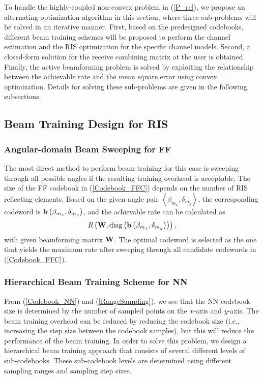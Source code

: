\documentclass[lettersize, journal]{IEEEtran}
\begin{document}
To handle the highly-coupled non-convex problem in (\ref{P_re}), we propose an alternating optimization algorithm in this section, where three sub-problems will be solved in an iterative manner.
First, based on the predesigned codebooks, different beam training schemes will be proposed to perform the channel estimation and the RIS optimization for the specific channel models.
Second, a closed-form solution for the receive combining matrix at the user is obtained.
Finally, the active beamforming problem is solved by exploiting the relationship between the achievable rate and the mean square error using convex optimization.
Details for solving these sub-problems are given in the following subsections.

\subsection{Beam Training Design for RIS} 

\subsubsection{ Angular-domain Beam Sweeping for FF }   \label{AngularSweeping} 

The most direct method to perform beam training for this case is sweeping through all possible angles if the resulting training overhead is acceptable.
The size of the FF codebook in (\ref{Codebook_FFC}) depends on the number of RIS reflecting elements.
Based on the given angle pair $\left \langle {\beta_{m_x}, \delta_{m_y} } \right \rangle$, the corresponding codeword is ${{\bf{b}}}\left( {\beta_{m_x}, \delta_{m_y}} \right)$, and the achievable rate can be calculated as
\begin{equation}
R \left( {\bf{W}}, {\rm diag} \left( {{\bf{b}}}\left( {\beta_{m_x}, \delta_{m_y}} \right) \right) \right),
\end{equation}
with given beamforming matrix ${\bf{W}}$.
The optimal codeword is selected as the one that yields the maximum rate after sweeping through all candidate codewords in (\ref{Codebook_FFC}). 


\subsubsection{ Hierarchical Beam Training Scheme for NN }   \label{HierarchicalTraining} 

From (\ref{Codebook_NN}) and (\ref{RangeSampling}), we see that the NN codebook size is determined by the number of sampled points on the $x$-axis and $y$-axis. 
The beam training overhead can be reduced by reducing the codebook size (i.e., increasing the step size between the codebook samples), but this will reduce the performance of the beam training.
In order to solve this problem, we design a hierarchical beam training approach that consists of several different levels of sub-codebooks. 
These sub-codebook levels are determined using different sampling ranges and sampling step sizes.
\end{document}
